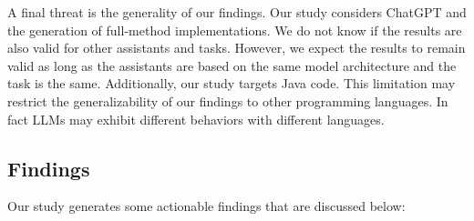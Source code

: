 A final threat is the generality of our findings. Our study considers ChatGPT and the generation of full-method implementations. We do not know if the results are also valid for other assistants and tasks. However, we expect the results to remain valid as long as the assistants are based on the same model architecture and the task is the same. Additionally, our study targets Java code. This limitation may restrict the generalizability of our findings to other programming languages. In fact LLMs may exhibit different behaviors with different languages. %
%



\subsection{Findings}

Our study generates some actionable findings that are discussed below:


